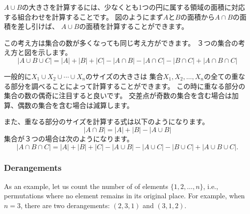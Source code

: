 $A \cup B$の大きさを計算するには、少なくとも1つの円に属する領域の面積に対応する組合わせを計算することです。
図のようにまず$A$と$B$の面積から$A \cap B$の面積を差し引けば、
$A \cup B$の面積を計算することができます。

この考え方は集合の数が多くなっても同じ考え方ができます。
３つの集合の考え方と図を示します。
\[ |A \cup B \cup C| = |A| + |B| + |C| - |A \cap B|  - |A \cap C|  - |B \cap C| + |A \cap B \cap C| \]

\begin{center}
\end{center}

一般的に$X_1 \cup X_2 \cup \cdots \cup X_n$のサイズの大きさは
集合$X_1,X_2,\ldots,X_n$の全ての重なる部分を調べることによって計算することができます。
この時に重なる部分の集合の数の偶奇に注目すると良いです。
交差点が奇数の集合を含む場合は加算、偶数の集合を含む場合は減算します。

また、重なる部分のサイズを計算する式は以下のようになります。
\[ |A \cap B| = |A| + |B| - |A \cup B|\]
集合が３つの場合は次のようになります。
\[ |A \cap B \cap C| = |A| + |B| + |C| - |A \cup B|  - |A \cup C|  - |B \cup C| + |A \cup B \cup C| .\]

\subsubsection{Derangements}


As an example, let us count the number of 
of elements $\{1,2,\ldots,n\}$, i.e., permutations
where no element remains in its original place.
For example, when $n=3$, there are
two derangements: $(2,3,1)$ and $(3,1,2)$.

